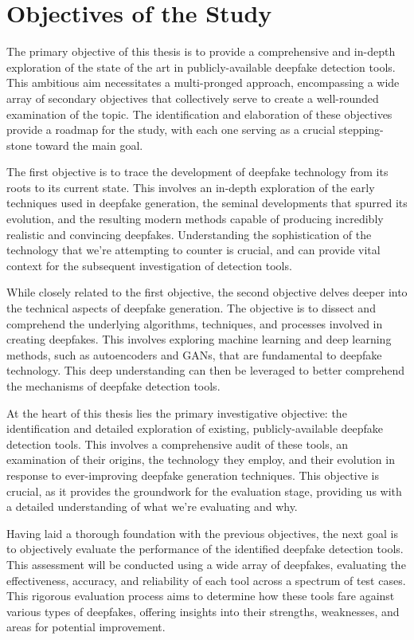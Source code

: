 \section{Objectives of the Study}\label{chapter:objectives}
The primary objective of this thesis is to provide a comprehensive and in-depth exploration 
of the state of the art in publicly-available deepfake detection tools. This ambitious aim 
necessitates a multi-pronged approach, encompassing a wide array of secondary objectives 
that collectively serve to create a well-rounded examination of the topic. The identification 
and elaboration of these objectives provide a roadmap for the study, with each one serving 
as a crucial stepping-stone toward the main goal.

The first objective is to trace the development of deepfake technology from its roots to its 
current state. This involves an in-depth exploration of the early techniques used in deepfake 
generation, the seminal developments that spurred its evolution, and the resulting modern 
methods capable of producing incredibly realistic and convincing deepfakes. Understanding the 
sophistication of the technology that we're attempting to counter is crucial, and can provide 
vital context for the subsequent investigation of detection tools.

While closely related to the first objective, the second objective delves deeper into the 
technical aspects of deepfake generation. The objective is to dissect and comprehend the 
underlying algorithms, techniques, and processes involved in creating deepfakes. This involves 
exploring machine learning and deep learning methods, such as autoencoders and 
\ac{GAN}s, that are fundamental to deepfake technology. This deep understanding can 
then be leveraged to better comprehend the mechanisms of deepfake detection tools.

At the heart of this thesis lies the primary investigative objective: the identification 
and detailed exploration of existing, publicly-available deepfake detection tools. 
This involves a comprehensive audit of these tools, an examination of their origins, 
the technology they employ, and their evolution in response to ever-improving deepfake 
generation techniques. This objective is crucial, as it provides the groundwork for 
the evaluation stage, providing us with a detailed understanding of what we're 
evaluating and why.

Having laid a thorough foundation with the previous objectives, the next goal is to objectively 
evaluate the performance of the identified deepfake detection tools. This assessment 
will be conducted using a wide array of deepfakes, evaluating the effectiveness, 
accuracy, and reliability of each tool across a spectrum of test cases. This rigorous 
evaluation process aims to determine how these tools fare against various types of 
deepfakes, offering insights into their strengths, weaknesses, and areas for potential 
improvement.

